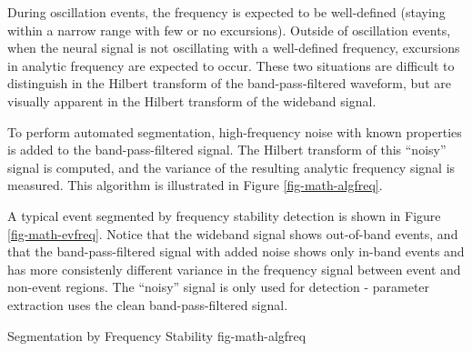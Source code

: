 During oscillation events, the frequency is expected to be well-defined
(staying within a narrow range with few or no excursions). Outside of
oscillation events, when the neural signal is not oscillating with a
well-defined frequency, excursions in analytic frequency are expected to
occur. These two situations are difficult to distinguish in the Hilbert
transform of the band-pass-filtered waveform, but are visually apparent
in the Hilbert transform of the wideband signal.

To perform automated segmentation, high-frequency noise with known
properties is added to the band-pass-filtered signal. The Hilbert transform
of this ``noisy'' signal is computed, and the variance of the resulting
analytic frequency signal is measured. This algorithm is illustrated
in Figure \ref{fig-math-algfreq}.

A typical event segmented by frequency stability detection is shown in
Figure \ref{fig-math-evfreq}. Notice that the wideband signal shows
out-of-band events, and that the band-pass-filtered signal with added
noise shows only in-band events and has more consistenly different variance
in the frequency signal between event and non-event regions. The ``noisy''
signal is only used for detection - parameter extraction uses the clean
band-pass-filtered signal.

{Segmentation by Frequency Stability}
{fig-math-algfreq}

